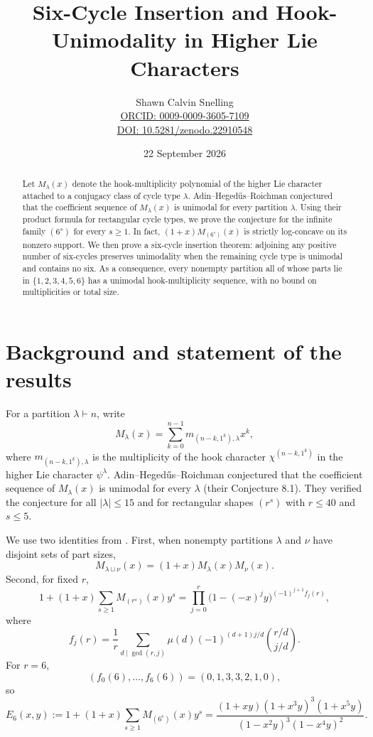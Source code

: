 \documentclass[11pt]{article}
\title{Six-Cycle Insertion and Hook-Unimodality in Higher Lie Characters}
\author{Shawn Calvin Snelling\\\href{https://orcid.org/0009-0009-3605-7109}{ORCID: 0009-0009-3605-7109}\\\href{https://doi.org/10.5281/zenodo.22910548}{DOI: 10.5281/zenodo.22910548}}
\date{22 September 2026}
\begin{document}
\maketitle

\begin{abstract}
Let $M_\lambda(x)$ denote the hook-multiplicity polynomial of the higher Lie character attached to a conjugacy class of cycle type $\lambda$. Adin--Heged\H{u}s--Roichman conjectured that the coefficient sequence of $M_\lambda(x)$ is unimodal for every partition $\lambda$. Using their product formula for rectangular cycle types, we prove the conjecture for the infinite family $(6^s)$ for every $s\ge1$. In fact, $(1+x)M_{(6^s)}(x)$ is strictly log-concave on its nonzero support. We then prove a six-cycle insertion theorem: adjoining any positive number of six-cycles preserves unimodality when the remaining cycle type is unimodal and contains no six. As a consequence, every nonempty partition all of whose parts lie in $\{1,2,3,4,5,6\}$ has a unimodal hook-multiplicity sequence, with no bound on multiplicities or total size.
\end{abstract}

\section{Background and statement of the results}
For a partition $\lambda\vdash n$, write
\[
M_\lambda(x)=\sum_{k=0}^{n-1}m_{(n-k,1^k),\lambda}x^k,
\]
where $m_{(n-k,1^k),\lambda}$ is the multiplicity of the hook character $\chi^{(n-k,1^k)}$ in the higher Lie character $\psi^\lambda$. Adin--Heged\H{u}s--Roichman \cite{AHR} conjectured that the coefficient sequence of $M_\lambda(x)$ is unimodal for every $\lambda$ (their Conjecture 8.1). They verified the conjecture for all $|\lambda|\le15$ and for rectangular shapes $(r^s)$ with $r\le40$ and $s\le5$.

We use two identities from \cite{AHR}. First, when nonempty partitions $\lambda$ and $\nu$ have disjoint sets of part sizes,
\begin{equation}
M_{\lambda\sqcup\nu}(x)=(1+x)M_\lambda(x)M_\nu(x).
\label{eq:disjoint}
\end{equation}
Second, for fixed $r$,
\begin{equation}
1+(1+x)\sum_{s\ge1}M_{(r^s)}(x)y^s
=\prod_{j=0}^r\bigl(1-(-x)^j y\bigr)^{(-1)^{j+1}f_j(r)},
\label{eq:AHRproduct}
\end{equation}
where
\[
f_j(r)=\frac1r\sum_{d\mid\gcd(r,j)}\mu(d)(-1)^{(d+1)j/d}\binom{r/d}{j/d}.
\]
For $r=6$,
\[
(f_0(6),\ldots,f_6(6))=(0,1,3,3,2,1,0),
\]
so
\begin{equation}
E_6(x,y):=1+(1+x)\sum_{s\ge1}M_{(6^s)}(x)y^s
=\frac{(1+xy)(1+x^3y)^3(1+x^5y)}{(1-x^2y)^3(1-x^4y)^2}.
\label{eq:E6}
\end{equation}
\end{document}

